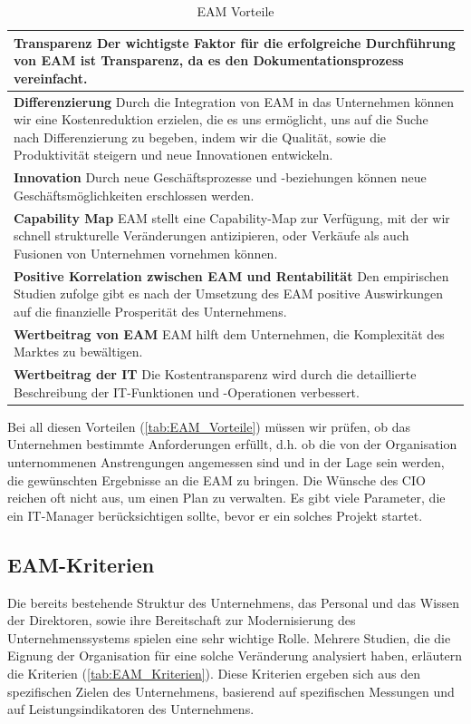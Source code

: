 \documentclass[
	doc,
	a4paper,
	helv
	]{apa6}
\begin{document}
\begin{table}[!htbp]
\caption{EAM Vorteile}
\begin{center}
\begin{tabularx}{\textwidth}{|X|}
\hline
\textbf{Transparenz} Der wichtigste Faktor für die erfolgreiche Durchführung von EAM ist Transparenz, da es den Dokumentationsprozess vereinfacht.
\\\hline
\textbf{Differenzierung} Durch die Integration von EAM in das Unternehmen können wir eine Kostenreduktion erzielen, die es uns ermöglicht, uns auf die Suche nach Differenzierung zu begeben, indem wir die Qualität, sowie die Produktivität steigern und neue Innovationen entwickeln.
\\\hline
\textbf{Innovation} Durch neue Geschäftsprozesse und  -beziehungen können neue Geschäftsmöglichkeiten erschlossen werden.
\\\hline
\textbf{Capability Map} EAM stellt eine Capability-Map zur Verfügung, mit der wir schnell strukturelle Veränderungen antizipieren, oder Verkäufe als auch Fusionen von Unternehmen vornehmen können.
\\\hline
\textbf{Positive Korrelation zwischen EAM und Rentabilität} Den empirischen Studien zufolge gibt es nach der Umsetzung des EAM positive Auswirkungen auf die finanzielle Prosperität des Unternehmens.
\\\hline
\textbf{Wertbeitrag von EAM} EAM hilft dem Unternehmen, die Komplexität des Marktes zu bewältigen.
\\\hline
\textbf{Wertbeitrag der IT} Die Kostentransparenz wird durch die detaillierte Beschreibung der IT-Funktionen und -Operationen verbessert.
\\\hline
\end{tabularx}
\end{center}
\label{tab:EAM_Vorteile}
\end{table}

\newpage
Bei all diesen Vorteilen (\autoref{tab:EAM_Vorteile}) müssen wir prüfen, ob das Unternehmen bestimmte Anforderungen erfüllt, d.h. ob die von der Organisation unternommenen Anstrengungen angemessen sind und in der Lage sein werden, die gewünschten Ergebnisse an die EAM zu bringen. Die Wünsche des CIO reichen oft nicht aus, um einen Plan zu verwalten. Es gibt viele Parameter, die ein IT-Manager berücksichtigen sollte, bevor er ein solches Projekt startet.

\subsection{EAM-Kriterien}
Die bereits bestehende Struktur des Unternehmens, das Personal und das Wissen der Direktoren, sowie ihre Bereitschaft zur Modernisierung des Unternehmenssystems spielen eine sehr wichtige Rolle. Mehrere Studien, die die Eignung der Organisation für eine solche Veränderung analysiert haben, erläutern die Kriterien (\autoref{tab:EAM_Kriterien}). Diese Kriterien ergeben sich aus den spezifischen Zielen des Unternehmens, basierend auf spezifischen Messungen und auf Leistungsindikatoren des Unternehmens.
\end{document}
